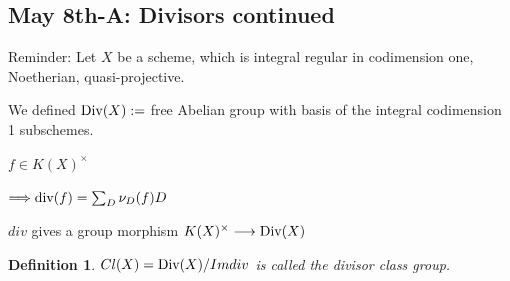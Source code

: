 \documentclass[11pt]{article}
\newtheorem{dfn}[thm]{Definition}
\renewcommand{\div}{\textnormal{div}}
\newcommand{\Div}{\textnormal{Div}}
\newcommand{\Lrta}{\Longrightarrow}
\newcommand{\lrta}{\longrightarrow}
\begin{document}
\subsection{May 8th-A: Divisors continued}

Reminder:
 Let $X$ be a scheme, which is integral regular in codimension one, Noetherian, quasi-projective.

 We defined $\Div(X):=$ free Abelian group with basis of the integral codimension 1 subschemes.

 $f\in K(X)^\times$

 $\Lrta \div(f)=\sum_D \nu_D(f)D$
 
 $div$ gives a group morphism $K(X)^\times\lrta \Div(X)$

\begin{dfn}
$Cl(X)=\Div(X)/Im div$ is called the divisor class group.
\end{dfn}
\end{document}
